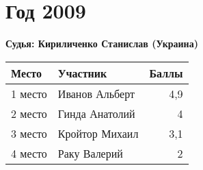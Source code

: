 \chapter{Год 2009}
\textbf{Судья: Кириличенко Станислав (Украина)}

\begin{tabularx}{\textwidth}{l l r}
Место & Участник & Баллы \\
\hline
1 место & Иванов Альберт & 4,9 \\
2 место & Гинда Анатолий & 4 \\
3 место & Кройтор Михаил & 3,1 \\
4 место & Раку Валерий & 2 \\
\end{tabularx}
